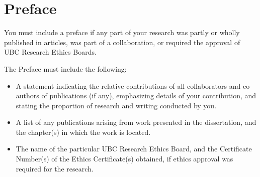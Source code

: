 \maketitle                      %
\begin{abstract}                %
  The \texttt{genthesis.cls} \LaTeX{} class file and accompanying
  documents, such as this sample thesis, are distributed in the hope
  that it will be useful but without any warranty (without even the
  implied warranty of fitness for a particular purpose).  For a
  description of this file's purpose, and instructions on its use, see
  below.

  These files are distributed under the GPL which should be included
  here in the future.  Please let the author know of any changes or
  improvements that should be made.

  Michael Forbes.
  mforbes@physics.ubc.ca
\end{abstract}

\chapter{Preface} %

You must include a preface if any part of your research was partly or
wholly published in articles, was part of a collaboration, or required
the approval of UBC Research Ethics Boards.

The Preface must include the following:

\begin{itemize}
\item A statement indicating the relative contributions of all
  collaborators and co-authors of publications (if any), emphasizing
  details of your contribution, and stating the proportion of research
  and writing conducted by you.
\item A list of any publications arising from work presented in the
  dissertation, and the chapter(s) in which the work is located.
\item The name of the particular UBC Research Ethics Board, and the
  Certificate Number(s) of the Ethics Certificate(s) obtained, if
  ethics approval was required for the research.
\end{itemize}

